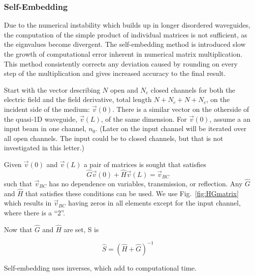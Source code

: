 \subsubsection {Self-Embedding}

Due to the numerical instability which builds up in longer disordered
waveguides, the computation of the simple product of individual matrices is
not sufficient, as the eignvalues become divergent. The self-embedding method is introduced 
slow the growth of computational error inherent in numerical matrix multiplication.
This method consistently corrects any deviation caused by rounding on every step of the multiplication and 
gives increased accuracy to the final result.  %

Start with the vector describing $N$ open and $N_c$ closed channels for both
the electric field and the field derivative, total length $N+N_c+N+N_c$, on the
incident side of the medium: $\vec{v}(0)$.  There is a similar vector on the otherside
of the quasi-1D waveguide, $\vec{v}(L)$, of the same dimension. For $\vec{v}(0)$, assume a an
input beam in one channel, $n_0$. (Later on the input channel will be iterated over
all open channels. The input could be to closed channels, but that is not investigated
in this letter.)

Given $\vec{v}(0)$ and $\vec{v}(L)$ a pair of matrices is sought that satisfies
\begin{equation}
\hat{G}\vec{v}(0) + \hat{H}\vec{v}(L) = \vec{v}_{BC}
\label{selfEmbedGHvBC}
\end{equation}
such that $\vec{v}_{BC}$ has no dependence on variables, transmission, or reflection.
Any $\hat{G}$ and $\hat{H}$ that satisfies these conditions can be used. We use
Fig.~\ref{fig:HGmatrix} which results in $\vec{v}_{BC}$ having zeros in all elements
except for the input channel, where there is a ``2''.  

Now that $\hat{G}$ and $\hat{H}$ are set, S is

\begin{equation}
\hat{S} = (\hat{H} + \hat{G})^{-1}
\label{selfEmbedSinvGH}
\end{equation}



Self-embedding uses inverses, which add to computational time.


